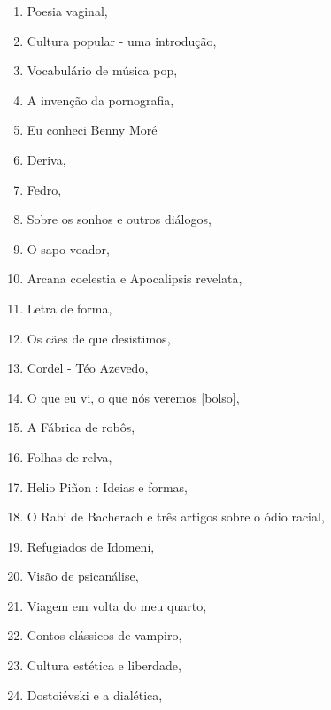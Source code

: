 \begin{multicols}{2}
\begin{enumerate}
\item Poesia vaginal, {}
\item Cultura popular - uma introdução, {}
\item Vocabulário de música pop, {}
\item A invenção da pornografia, {}
\item Eu conheci Benny Moré
\item Deriva, {}
\item Fedro, {}
\item Sobre os sonhos e outros diálogos, {}
\item O sapo voador, {}
\item Arcana coelestia e Apocalipsis revelata, {}
\item Letra de forma, {}
\item Os cães de que desistimos, {}
\item Cordel - Téo Azevedo, {}
\item O que eu vi, o que nós veremos [bolso], {}
\item A Fábrica de robôs, {}
\item Folhas de relva, {}
\item Helio Piñon : Ideias e formas, {}
\item O Rabi de Bacherach e três artigos sobre o ódio racial, {}
\item Refugiados de Idomeni, {}
\item Visão de psicanálise, {}
\item Viagem em volta do meu quarto, {}
\item Contos clássicos de vampiro, {}
\item Cultura estética e liberdade, {}
\item Dostoiévski e a dialética, {}

\end{enumerate}
\end{multicols}
